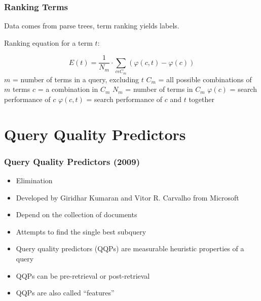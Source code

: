 \documentclass{beamer}
\begin{document}
\begin{frame}[fragile]\frametitle{Ranking Terms}
Data comes from parse trees, term ranking yields labels.

Ranking equation for a term $t$:

\begin{equation*}
E(t) = \frac{1}{N_m}\cdot\sum_{c\epsilon C_{m}}\left ( \varphi \left (c, t  \right ) - \varphi \left ( c \right ) \right )
\end{equation*}
$m$ = number of terms in a query, excluding $t$ \linebreak$C_m$ = all possible combinations of $m$ terms
\linebreak$c$ = a combination in $C_m$ \linebreak$N_m$ = number of terms in $C_m$ \linebreak$\varphi(c)$
= search performance of $c$ \linebreak$\varphi(c,t)$ = search performance of $c$ and $t$ together
\end{frame}

\section{Query Quality Predictors}

\begin{frame}[fragile]\frametitle{Query Quality Predictors (2009)}
\begin{itemize}
\item Elimination \pause
\item Developed by Giridhar Kumaran and Vitor R. Carvalho from Microsoft \pause
\item Depend on the collection of documents \pause
\item Attempts to find the single best subquery \pause
\item Query quality predictors (QQPs) are measurable heuristic properties of a query \pause
\item QQPs can be pre-retrieval or post-retrieval \pause
\item QQPs are also called ``features''
\end{itemize}
\end{frame}
\end{document}
